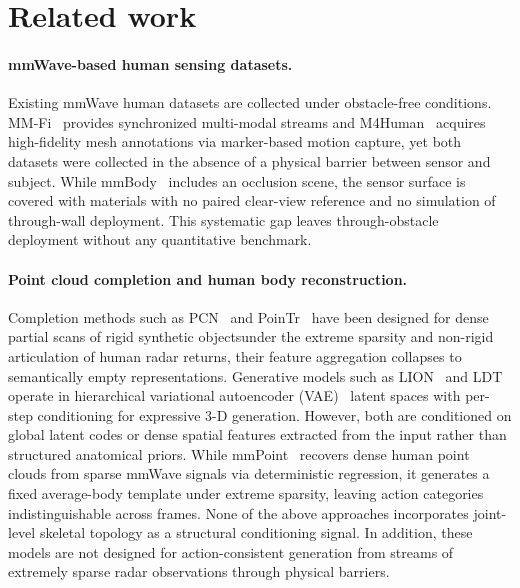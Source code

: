 \documentclass{article}
\begin{document}
\section{Related work}
\label{sec:related}

\paragraph{mmWave-based human sensing datasets.}
Existing mmWave human datasets are collected under obstacle-free
conditions.
MM-Fi~\cite{yang2023mm} provides synchronized multi-modal streams and
M4Human~\cite{fan2025m4human} acquires high-fidelity mesh annotations via
marker-based motion capture, yet both datasets were collected in the absence of a physical barrier between
sensor and subject.
While mmBody~\cite{chen2022mmbody} includes an occlusion scene, the sensor surface is covered with materials with no paired clear-view reference and
no simulation of through-wall deployment.
This systematic gap leaves through-obstacle deployment without any quantitative benchmark.

\paragraph{Point cloud completion and human body reconstruction.}
Completion methods such as PCN~\cite{yuan2018pcn} and PoinTr~\cite{yu2021pointr} have been designed for dense partial scans of rigid synthetic objects\textemdash under the extreme sparsity and non-rigid articulation of human radar returns, their feature aggregation collapses to semantically empty representations. Generative models such as LION~\cite{vahdat2022lion} and LDT~\cite{ji2024latent} operate in
hierarchical variational autoencoder (VAE)~\cite{kingma2013auto} latent spaces with per-step conditioning for
expressive 3-D generation. However, both are conditioned on global latent codes or
dense spatial features extracted from the input rather than structured
anatomical priors. While mmPoint~\cite{xie2023mmpoint} recovers dense human point clouds from sparse
mmWave signals via deterministic regression, it generates a fixed
average-body template under extreme sparsity, leaving action categories
indistinguishable across frames. None of the above approaches incorporates joint-level skeletal topology as a
structural conditioning signal. In addition, these models are not designed for action-consistent
generation from streams of extremely sparse radar observations through
physical barriers.
\end{document}
